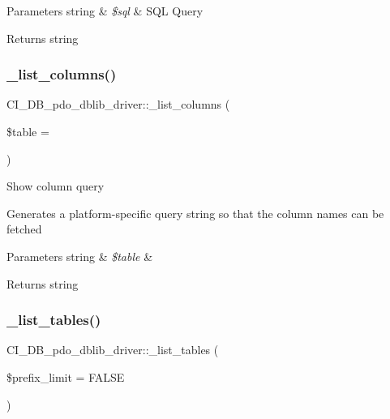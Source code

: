 \begin{DoxyParams}[1]{Parameters}
string & {\em \$sql} & S\+QL Query \\
\hline
\end{DoxyParams}
\begin{DoxyReturn}{Returns}
string 
\end{DoxyReturn}
\mbox{\label{class_c_i___d_b__pdo__dblib__driver_a4ddd8c3265777f8dfe9615d2f598938c}} 
\subsubsection{\texorpdfstring{\+\_\+list\+\_\+columns()}{\_list\_columns()}}
{\footnotesize\ttfamily C\+I\+\_\+\+D\+B\+\_\+pdo\+\_\+dblib\+\_\+driver\+::\+\_\+list\+\_\+columns (\begin{DoxyParamCaption}\item[{}]{\$table = {\ttfamily \textquotesingle{}\textquotesingle{}} }\end{DoxyParamCaption})\hspace{0.3cm}{\ttfamily [protected]}}

Show column query

Generates a platform-\/specific query string so that the column names can be fetched


\begin{DoxyParams}[1]{Parameters}
string & {\em \$table} & \\
\hline
\end{DoxyParams}
\begin{DoxyReturn}{Returns}
string 
\end{DoxyReturn}
\mbox{\label{class_c_i___d_b__pdo__dblib__driver_a69cbb9bb8ce520296a323f5314063a6b}} 
\subsubsection{\texorpdfstring{\+\_\+list\+\_\+tables()}{\_list\_tables()}}
{\footnotesize\ttfamily C\+I\+\_\+\+D\+B\+\_\+pdo\+\_\+dblib\+\_\+driver\+::\+\_\+list\+\_\+tables (\begin{DoxyParamCaption}\item[{}]{\$prefix\+\_\+limit = {\ttfamily FALSE} }\end{DoxyParamCaption})\hspace{0.3cm}{\ttfamily [protected]}}

